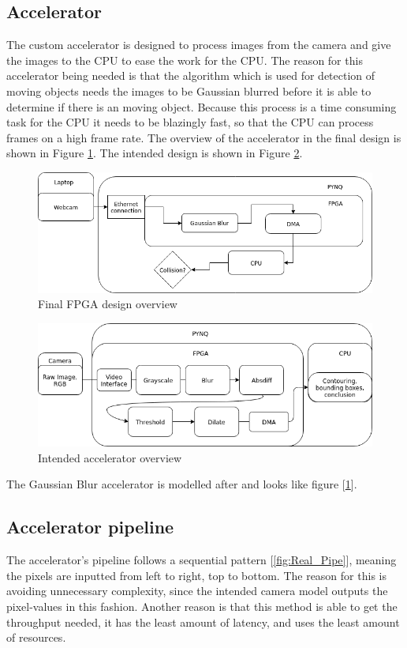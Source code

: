 \subsection{Accelerator}
The custom accelerator is designed to process images from the camera and give the images to the CPU to ease the work for the CPU. The reason for this accelerator being needed is that the algorithm which is used for detection of moving objects needs the images to be Gaussian blurred before it is able to determine if there is an moving object. Because this process is a time consuming task for the CPU it needs to be blazingly fast, so that the CPU can process frames on a high frame rate. The overview of the accelerator in the final design is shown in Figure \ref{fig:fpga1}. The intended design is shown in Figure \ref{fig:fpga2}.

\begin{figure}
    \centering
    \includegraphics[scale=0.4]{Images/PipielineFinalFinal-Page-1.png}
    \caption{Final FPGA design overview}
    \label{fig:fpga1}
\end{figure}

\begin{figure}
    \centering
    \includegraphics[scale=0.4]{Images/PipielineFinalFinal-Page-2.png}
    \caption{Intended accelerator overview}
    \label{fig:fpga2}
\end{figure}

The Gaussian Blur accelerator is modelled after \cite{cong2014optimal} and looks like figure [\ref{fig:fpga1}].

\subsection{Accelerator pipeline}
The accelerator's pipeline follows a sequential pattern [\ref{fig:Real_Pipe}], meaning the pixels are inputted from left to right, top to bottom. The reason for this is avoiding unnecessary complexity, since the intended camera model outputs the pixel-values in this fashion. Another reason is that this method is able to get the throughput needed, it has the least amount of latency, and uses the least amount of resources.

